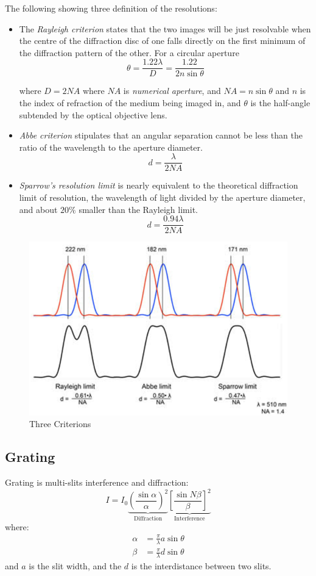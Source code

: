 \documentclass[UTF8]{book}
\begin{document}
The following showing three definition of the resolutions:
\begin{itemize}
\item The \emph{Rayleigh criterion} states that the two images will be just resolvable when the centre of the diffraction disc of one falls directly on the first minimum of the diffraction pattern of the other. For a circular aperture
\[\theta =\frac{1.22\lambda }{D}=\frac{1.22}{2n\sin \theta }\]

where $D=2NA$ where $NA$ is  \emph{numerical aperture}, and $NA=n\sin \theta $ and $n$ is the index of refraction of the medium being imaged in, and $\theta $ is the half-angle subtended by the optical objective lens.
\item \emph{Abbe criterion} stipulates that an angular separation cannot be less than the ratio of the wavelength to the aperture diameter.
\[d = \frac{\lambda}{2NA}\]

\item \emph{Sparrow's resolution limit} is nearly equivalent to the theoretical diffraction limit of resolution, the wavelength of light divided by the aperture diameter, and about $20\%$ smaller than the Rayleigh limit.
\[d = \frac{0.94\lambda }{2NA}\]
\end{itemize}
\begin{figure}[H]
\centering
\label{fig:Diffraction and Image Resolution1}
\includegraphics[scale=1]{Figure/27.PNG}
\caption{Three Criterions}
\end{figure}


\subsection{Grating}
Grating is multi-slits interference and diffraction:
\[I=I_0\underbrace{\left(\frac{\sin \alpha}{\alpha}\right)^2}_\text{Diffraction}\underbrace{\left[\frac{\sin N\beta }{\beta }\right]^2}_\text{Interference}\]
where:
\begin{align*}
\alpha &=\frac{\pi }{\lambda }a\sin \theta\\
\beta &=\frac{\pi }{\lambda }d\sin \theta
\end{align*}
and $a$ is the slit width, and the $d$ is the interdistance between two slits.
\end{document}
